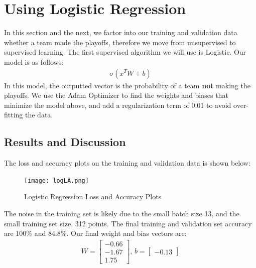 \documentclass[10pt,letterpaper]{article}
\begin{document}
\section*{Using Logistic Regression}
In this section and the next, we factor into our training and validation data whether a team made the playoffs, therefore we move from unsupervised to supervised learning. The first supervised algorithm we will use is Logistic. Our model is as follows:
\begin{align*}
    \sigma (x^TW+b)
\end{align*}
In this model, the outputted vector is the probability of a team \textbf{not} making the playoffs. We use the Adam Optimizer to find the weights and biases that minimize the model above, and add a regularization term of 0.01 to avoid over-fitting the data.

\subsection*{Results and Discussion}
The loss and accuracy plots on the training and validation data is shown below:
\begin{figure}[H]
    \centering
    \texttt{[image: logLA.png]}
    \caption{Logistic Regression Loss and Accuracy Plots}
    \label{fig:Logistic}
\end{figure}
The noise in the training set is likely due to the small batch size 13, and the small training set size, 312 points. The final training and validation set accuracy are 100\% and 84.8\%. Our final weight and bias vectors are:
\begin{align*}
    W = \begin{bmatrix}
           -0.66 \\
           -1.67 \\
            1.75
         \end{bmatrix} \text{,                 }
   b = \begin{bmatrix}
   -0.13
 \end{bmatrix}  
\end{align*}
\end{document}
